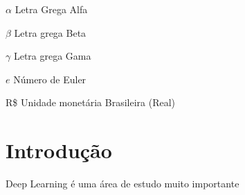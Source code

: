 \documentclass[
  12pt,		%
  a4paper,	%
  openright,%
  oneside,	%
  chapter=TITLE,		%
  section=TITLE,		%
  english,	%
  french,	%
  spanish,	%
  brazil	%
]{abntex2}
\begin{document}
    
    \begin{simbolos}
        \item[$\alpha$] Letra Grega Alfa
        \item[$\beta$] Letra grega Beta
        \item[$\gamma$] Letra grega Gama
        \item[$e$] Número de Euler
        \item[R\$] Unidade monetária Brasileira (Real)
    \end{simbolos}
    
    
    \tableofcontents*
    \newpage
    
    
    \textual
    \pagestyle{simple} 
    
    
    \chapter{Introdução}
    Deep Learning é uma área de estudo muito importante
    
\end{document}
